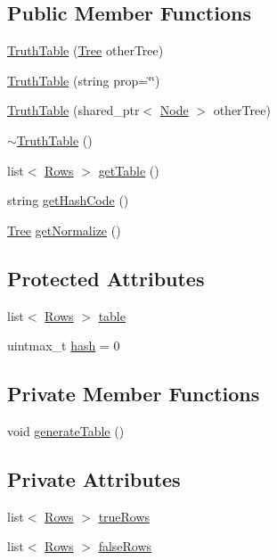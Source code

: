 \subsection*{Public Member Functions}
\begin{DoxyCompactItemize}
\item 
\hyperlink{class_truth_table_a1d7d8e978c1ab80e94f5433efc914f49}{Truth\+Table} (\hyperlink{class_tree}{Tree} other\+Tree)
\item 
\hyperlink{class_truth_table_abab023791b3a72496ff56434fc0e02b4}{Truth\+Table} (string prop=\char`\"{}\char`\"{})
\item 
\hyperlink{class_truth_table_afe78a848779c34a2c0eb23ecf1e6db6f}{Truth\+Table} (shared\+\_\+ptr$<$ \hyperlink{class_node}{Node} $>$ other\+Tree)
\item 
\hyperlink{class_truth_table_a1574928e406cb242a4f1abb6bc2924f3}{$\sim$\+Truth\+Table} ()
\item 
list$<$ \hyperlink{class_rows}{Rows} $>$ \hyperlink{class_truth_table_a3683cdc11d4f4735e449aa82c8095357}{get\+Table} ()
\item 
string \hyperlink{class_truth_table_ae44f1c65f1d2e8c350eb7f17bd88f777}{get\+Hash\+Code} ()
\item 
\hyperlink{class_tree}{Tree} \hyperlink{class_truth_table_a9dcb8d74d39ebc1a8ada938f1ccbce97}{get\+Normalize} ()
\end{DoxyCompactItemize}
\subsection*{Protected Attributes}
\begin{DoxyCompactItemize}
\item 
list$<$ \hyperlink{class_rows}{Rows} $>$ \hyperlink{class_truth_table_a6b3635efcbbc292d0dc62406fbdbe9e5}{table}
\item 
uintmax\+\_\+t \hyperlink{class_truth_table_a58fc63ab16768b58accfe0448a4cd68c}{hash} = 0
\end{DoxyCompactItemize}
\subsection*{Private Member Functions}
\begin{DoxyCompactItemize}
\item 
void \hyperlink{class_truth_table_ab113db56063be5ecf661ebc7fc439aee}{generate\+Table} ()
\end{DoxyCompactItemize}
\subsection*{Private Attributes}
\begin{DoxyCompactItemize}
\item 
list$<$ \hyperlink{class_rows}{Rows} $>$ \hyperlink{class_truth_table_a39ed5bd7c7af143af2bdc1d48eee669f}{true\+Rows}
\item 
list$<$ \hyperlink{class_rows}{Rows} $>$ \hyperlink{class_truth_table_af585b18e1c5a1d4e456ae25c6d1ab6f9}{false\+Rows}
\end{DoxyCompactItemize}
